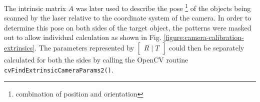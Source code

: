 The intrinsic matrix $A$ was later used to describe the pose
\footnote{combination of position and orientation} of the objects being
scanned by the laser relative to the coordinate system of the camera. In order
to determine this pose on both sides of the target object, the patterns were
masked out to allow individual calculation as shown in Fig.
\ref{figure:camera-calibration-extrinsics}. The parameters represented by
$\begin{bmatrix}R \mid T\end{bmatrix}$ could then be separately calculated for
both the sides by calling the OpenCV routine
\texttt{cvFindExtrinsicCameraParams2()}.

